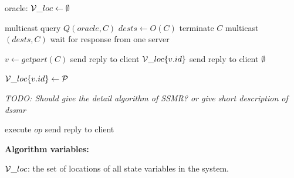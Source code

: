 \begin{algorithm}
\small
\begin{distribalgo}[1]
\vspace{1mm}

    \STATE  oracle: $\mathcal{V}\_loc \leftarrow \emptyset$
\ENDINDENT

\vspace{1.5mm}

	\STATE multicast query $Q(oracle, C)$ \label{algline:query_oracle} 
    \STATE $dests \leftarrow O(C)$ \label{algline:oracle_response} 
    	\STATE terminate $C$ \label{algline:cli_terminate}
    \ELSE
    	\STATE multicast$(dests, C)$ \label{algline:cli_mcast}
    	\STATE wait for response from one server
    \ENDIF
\ENDINDENT

\vspace{1.5mm}

		\STATE $v \leftarrow get part(C)$
			\STATE send reply to client $\mathcal{V}\_loc\{v.id\}$
		\ELSE
			\STATE send reply to client $\emptyset$
		\ENDIF
	\ENDINDENT

		\STATE $\mathcal{V}\_loc\{v.id\} \leftarrow \mathcal{P}$
	\ENDINDENT

\ENDINDENT

\vspace{1.5mm}
\emph{TODO: Should give the detail algorithm of SSMR? or give short description of dssmr}
\vspace{1.5mm}

		\STATE execute $op$ \label{algline:executeopck}
		\STATE send reply to client \label{algline:sendreply}
	\ENDINDENT
\ENDINDENT


\vspace{1.5mm}

\textbf{Algorithm variables:}

\vspace{1mm}

$\mathcal{V}\_loc$: the set of locations of all state variables in the system.

\vspace{1mm}


\end{distribalgo}
\end{algorithm}

